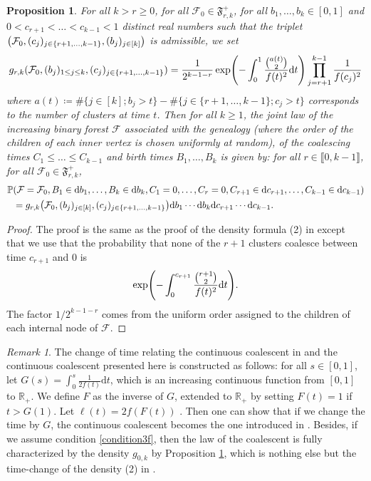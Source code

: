 \documentclass[11pt]{article}
\theoremstyle{plain}
\newtheorem{proposition}[theorem]{Proposition}
\theoremstyle{definition}
\theoremstyle{remark}
\newtheorem{remark}[theorem]{Remark}
\newcommand{\R}{\mathbb{R}} %
\renewcommand{\P}{{\mathbb{P}}} %
\newcommand{\1}{\mathbbm{1}} %
\newcommand{\proba}[1]{\mathbb{P}\left(#1\right)} %
\let\originalleft\left
\let\originalright\right
\renewcommand{\left}{\mathopen{}\mathclose\bgroup\originalleft}
\renewcommand{\right}{\aftergroup\egroup\originalright}
\begin{document}
\begin{proposition}\label{loi du coalescent généralisé}
For all $k>r\ge 0$, for all $\mathcal{F}_0 \in \mathfrak{F}^+_{r,k}$, for all $b_1, \ldots , b_k \in [0,1]$ and $0<c_{r+1}<\ldots < c_{k-1}<1$ distinct real numbers such that the triplet $\left(\mathcal{F}_0, (c_j)_{j \in \{r+1,\ldots, k-1\}}, (b_j)_{j \in [k]}\right)$ is admissible, we set
\[
g_{r,k}(\mathcal{F}_0,(b_j)_{1\le j\le k}, (c_j)_{j \in \{r+1,\ldots, k-1\}})=   \frac{1}{2^{k-1-r}}\exp\left( -\int_0^1 \frac{ \binom{a(t)}{2}}{f(t)^2} \mathrm{d}t \right) \prod_{j=r+1}^{k-1} \frac{1}{f(c_j)^2}
\]
where $a(t) \coloneqq \#\{j\in [k] ; b_j>t \} -\#\{j\in \{r+1,\ldots, k-1\} ; c_j>t \}$ corresponds to the number of clusters at time $t$.
Then for all $k\ge 1$, the joint law of the increasing binary forest $\mathcal{F}$ associated with the genealogy (where the order of the children of each inner vertex is chosen uniformly at random), of the coalescing times $C_1\le \ldots\le C_{k-1}$ and birth times $B_1,\ldots,B_k$ is given by: for all $r \in \llbracket 0, k-1 \rrbracket$, for all $\mathcal{F}_0 \in \mathfrak{F}^+_{r,k}$, 
\begin{align*}
\P&(\mathcal{F}=\mathcal{F}_0, B_1 \in \mathrm{d}b_1, \ldots, B_k \in \mathrm{d}b_k, C_1=0,\ldots,C_r=0,C_{r+1} \in \mathrm{d}c_{r+1}, \ldots, C_{k-1} \in \mathrm{d}c_{k-1}) \\
&=g_{r,k}\left(\mathcal{F}_0, (b_j)_{j \in [k]}, (c_j)_{j \in \{r+1,\ldots, k-1\}}\right)\mathrm{d}b_1 \cdots \mathrm{d}b_k \mathrm{d}c_{r+1} \cdots \mathrm{d}c_{k-1}.
\end{align*}
\end{proposition}
\begin{proof}
The proof is the same as the proof of the density formula (2) in \cite{A98} except that we use that the probability that none of the $r+1$ clusters coalesce between time $c_{r+1}$ and $0$ is
\[
\exp \left({-\int_0^{c_{r+1}} \frac{\binom{r+1}{2}}{f(t)^2} \mathrm{d}t} \right).
\]
The factor ${1}/{2^{k-1-r}}$ comes from the uniform order assigned to the children of each internal node of $\mathcal{F}$.
\end{proof}

\begin{remark}
\label{rem:timechange}
The change of time relating the continuous coalescent in \cite{A98} and the continuous coalescent presented here is constructed as follows: for all $s \in [0,1]$, let $G(s) = \int_0^s \frac{1}{2f(t)} \mathrm{d}t$, which is an increasing continuous function from $[0,1]$ to $\R_+$. We define $F$ as the inverse of $G$, extended to $\R_+$ by setting $F(t)=1$ if $t>G(1)$. Let $\ell(t)=2f(F(t))$
. Then one can show that if we change the time by $G$, the continuous coalescent becomes the one introduced in \cite{A98}. Besides, if we assume  condition \eqref{condition3f}, then the law of the coalescent is fully characterized by the density $g_{0,k}$ by Proposition \ref{loi du coalescent généralisé}, which is nothing else but the time-change of the density (2) in \cite{A98}. 
\end{remark}
\end{document}
